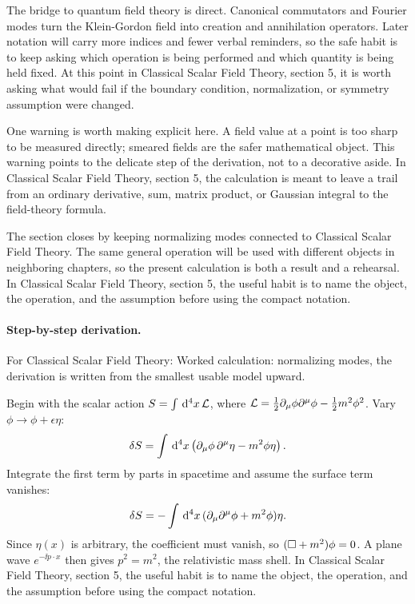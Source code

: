 The bridge to quantum field theory is direct.  Canonical commutators and Fourier modes turn the Klein-Gordon field into creation and annihilation operators.  Later notation will carry more indices and fewer verbal reminders, so the safe habit is to keep asking which operation is being performed and which quantity is being held fixed.  At this point in Classical Scalar Field Theory, section 5, it is worth asking what would fail if the boundary condition, normalization, or symmetry assumption were changed.

One warning is worth making explicit here.  A field value at a point is too sharp to be measured directly; smeared fields are the safer mathematical object.  This warning points to the delicate step of the derivation, not to a decorative aside.  In Classical Scalar Field Theory, section 5, the calculation is meant to leave a trail from an ordinary derivative, sum, matrix product, or Gaussian integral to the field-theory formula.

The section closes by keeping normalizing modes connected to Classical Scalar Field Theory.  The same general operation will be used with different objects in neighboring chapters, so the present calculation is both a result and a rehearsal.  In Classical Scalar Field Theory, section 5, the useful habit is to name the object, the operation, and the assumption before using the compact notation.



\paragraph{Step-by-step derivation.}

For Classical Scalar Field Theory: Worked calculation: normalizing modes, the derivation is written from the smallest usable model upward.

Begin with the scalar action \(S=\int\,\mathrm d^4x\,\mathcal L\), where \(\mathcal L=\frac12\partial_\mu\phi\partial^\mu\phi-\frac12m^2\phi^2\).  Vary \(\phi\to\phi+\epsilon\eta\):
\[
  \delta S=\int\,\mathrm d^4x\left(\partial_\mu\phi\,\partial^\mu\eta-m^2\phi\eta\right).
\]
Integrate the first term by parts in spacetime and assume the surface term vanishes:
\[
  \delta S=-\int\,\mathrm d^4x\,(\partial_\mu\partial^\mu\phi+m^2\phi)\eta.
\]
Since \(\eta(x)\) is arbitrary, the coefficient must vanish, so \((\Box+m^2)\phi=0\).  A plane wave \(e^{-\ii p\cdot x}\) then gives \(p^2=m^2\), the relativistic mass shell.  In Classical Scalar Field Theory, section 5, the useful habit is to name the object, the operation, and the assumption before using the compact notation.

